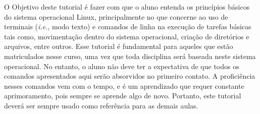 O Objetivo deste tutorial é fazer com que o aluno entenda os princípios básicos do sistema operacional Linux, principalmente no que concerne ao uso de terminais (\textit{i.e.}, modo texto) e comandos de linha na execução de tarefas básicas tais como, movimentação dentro do sistema operacional, criação de diretórios e arquivos, entre outros. Esse tutorial é fundamental para aqueles que estão matriculados nesse curso, uma vez que toda disciplina será baseada neste sistema operacional. No entanto, o aluno não deve ter a expectativa de que todos os comandos apresentados aqui serão absorvidos no primeiro contato. A proficiência nesses comandos vem com o tempo, e é um aprendizado que requer constante aprimoramento, pois sempre se aprende algo de novo. Portanto, este tutorial deverá ser sempre usado como referência para as demais aulas.\\
\newpage
\pagestyle{fancy} %
